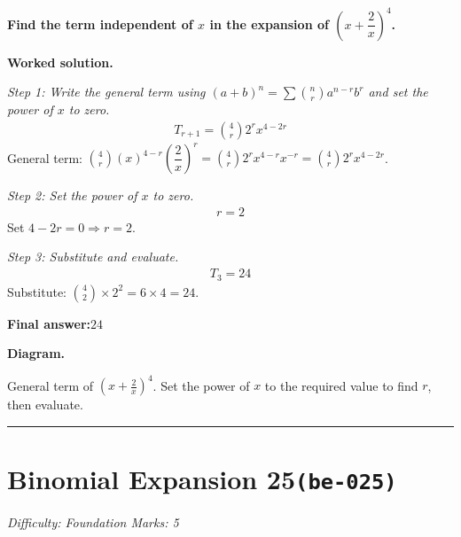 \documentclass[11pt]{article}
\newcommand{\question}[1]{\par\medskip\noindent\textbf{#1}\par}
\begin{document}
\question{Find the term independent of \( x \) in the expansion of \( \left(x + \dfrac{2}{x}\right)^4 \).}

\textbf{Worked solution.}

\textit{Step 1: Write the general term using \((a+b)^n = \sum \binom{n}{r} a^{n-r} b^r\) and set the power of \(x\) to zero.}
\[\begin{gathered}
T_{r+1} = \binom{4}{r} 2^r x^{4-2r}
\end{gathered}\]
General term: \( \binom{4}{r}(x)^{4-r}\left(\dfrac{2}{x}\right)^r = \binom{4}{r} 2^r x^{4-r} x^{-r} = \binom{4}{r} 2^r x^{4-2r} \).

\textit{Step 2: Set the power of \(x\) to zero.}
\[\begin{gathered}
r = 2
\end{gathered}\]
Set \(4 - 2r = 0 \Rightarrow r = 2\).

\textit{Step 3: Substitute and evaluate.}
\[\begin{gathered}
T_3 = 24
\end{gathered}\]
Substitute: \(\binom{4}{2} \times 2^2 = 6 \times 4 = 24\).

\begin{answerbox}
\textbf{Final answer:}\quad \(\displaystyle 24\)
\end{answerbox}
\textbf{Diagram.}

\begin{center}
\end{center}
\small General term of $\left(x+\frac{2}{x}\right)^{4}$. Set the power of $x$ to the required value to find $r$, then evaluate.\normalsize

\medskip\hrule

\section*{Binomial Expansion 25\quad\small\texttt{(be-025)}}
\textit{Difficulty: Foundation \quad\textbar\quad Marks: 5}
\end{document}
